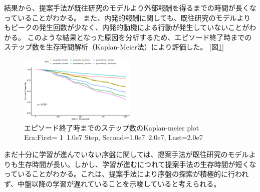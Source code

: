 結果から、提案手法が既往研究のモデルより外部報酬を得るまでの時間が長くなっていることがわかる。
また、内発的報酬に関しても、既往研究のモデルよりもピークの発生回数が少なく、内発的動機による行動が発生していないことがわかる。
このような結果となった原因を分析するため、エピソード終了時までのステップ数を生存時間解析（Kaplan-Meier法）により評価した。
[図\ref{fig7:figure7}]
\begin{figure}[t]
   \centering
   \includegraphics[width=0.5\textwidth]{kaplan_meier_plot.eps}
   \caption{エピソード終了時までのステップ数のKaplan-meier plot\\Era:First= 1~1.0e7 Step, Second=1.0e7~2.0e7, Last=2.0e7~}\label{fig7:figure7}
\end{figure}
まだ十分に学習が進んでいない序盤に関しては、提案手法が既往研究のモデルよりも生存時間が長い。しかし、学習が進むにつれて提案手法の生存時間が短くなっていることがわかる。これは、提案手法により序盤の探索が積極的に行われず、中盤以降の学習が遅れていることを示唆していると考えられる。

